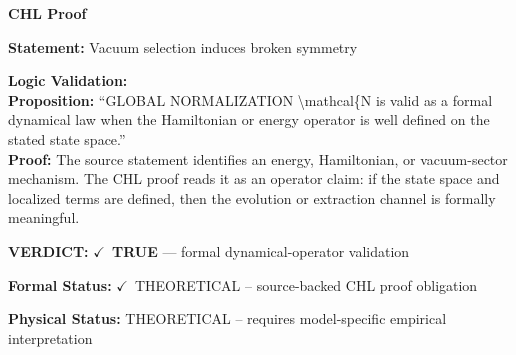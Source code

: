 \vspace{0.45em}
\noindent\textbf{CHL Proof}\par
\textbf{Statement:} Vacuum selection induces broken symmetry

\textbf{Logic Validation:}\\
\textbf{Proposition:} ``GLOBAL NORMALIZATION \textbackslash{}mathcal\{N is valid as a formal dynamical law when the Hamiltonian
or energy operator is well defined on the stated state space.''\\
\textbf{Proof:} The source statement identifies an energy, Hamiltonian, or vacuum-sector mechanism. The
CHL proof reads it as an operator claim: if the state space and localized terms are
defined, then the evolution or extraction channel is formally meaningful.

\textbf{VERDICT:} \ensuremath{\checkmark}\ \textbf{TRUE} --- formal dynamical-operator validation

\textbf{Formal Status:} \ensuremath{\checkmark}\ THEORETICAL -- source-backed CHL proof obligation

\textbf{Physical Status:} THEORETICAL -- requires model-specific empirical interpretation
\par\vspace{0.45em}
\par
\ifTZPDarkEdition
{}
\fi
\endgroup
\endgroup
